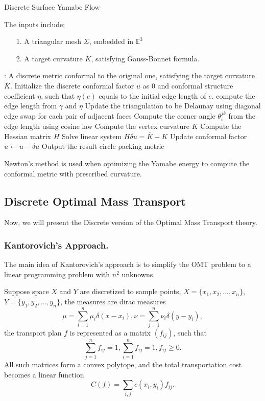\documentclass[runningheads]{llncs}
\begin{document}
\begin{algorithm}
\caption{Discrete Surface Yamabe Flow}
\begin{algorithmic}[1]
	\REQUIRE The inputs include:
	\begin{enumerate}
	\item[1.] A triangular mesh $\Sigma$, embedded in $\mathbb{E}^3$
	\item[2.] A target curvature $\bar{K}$, satisfying Gauss-Bonnet formula.
	\end{enumerate}
	\ENSURE: A discrete metric conformal to the original one, satisfying the target curvature $\bar{K}$.
  	\STATE Initialize the discrete conformal factor $u$ as 0 and conformal structure coefficient $\eta$, such that $\eta(e)$ equals to the initial edge length of $e$.
  	\STATE compute the edge length from $\gamma$ and $\eta$
  	\STATE Update the triangulation to be Delaunay using diagonal edge swap for each pair of adjacent faces
  	\STATE Compute the corner angle $\theta^{jk}_i$ from the edge length using cosine law
  	\STATE Compute the vertex curvature $K$
  	\STATE Compute the Hessian matrix $H$
  	\STATE Solve linear system $H\delta u=\bar{K}-K$
  	\STATE Update conformal factor $u\leftarrow u-\delta u$
  	\ENDWHILE
  	\STATE Output the result circle packing metric
\end{algorithmic}
\label{Algo:yamabe}
\end{algorithm}

Newton's method is used when optimizing the Yamabe energy to compute the conformal metric with prescribed curvature.




\subsection{Discrete Optimal Mass Transport}

Now, we will present the Discrete version of the Optimal Mass Transport theory.


\subsubsection{Kantorovich's Approach.}

The main idea of Kantorovich's approach is to simplify the OMT problem to a linear programming problem with $n^2$ unknowns.

Suppose space $X$ and $Y$ are discretized to sample points, $X=\{x_1,x_2,...,x_n\}$, $Y=\{y_1,y_2,...,y_n\}$, the measures are dirac measures $$\mu=\sum^n_{i=1}\mu_i\delta(x-x_i),\nu=\sum^n_{j=1}\nu_i\delta(y-y_i),$$
the transport plan $f$ is represented as a matrix $(f_{ij})$, such that $$\sum^n_{j=1}f_{ij}=1,\sum^n_{i=1}f_{ij}=1,f_{ij}\geq 0.$$
All such matrices form a convex polytope, and the total transportation cost becomes a linear function $$C(f)=\sum_{i,j}c(x_i,y_i)f_{ij}.$$
\end{document}
